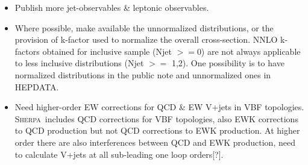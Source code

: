 \documentclass[a4paper,11pt,notoc]{article}
\newcommand{\SHERPA}{\textsc{Sherpa}}
\begin{document}
\begin{itemize}
\item Publish more jet-observables \& leptonic observables.
\item Where possible, make available the unnormalized distributions, or the provision of k-factor used to normalize the overall cross-section. NNLO k-factors obtained for inclusive sample (Njet $>=$0) are not always applicable to less inclusive distributions (Njet $>=$ 1,2). One possibility is to have normalized distributions in the public note and unnormalized ones in HEPDATA.
\item Need higher-order EW corrections for QCD \& EW V+jets in VBF topologies. \SHERPA\ includes QCD corrections for VBF topologies, also EWK corrections to QCD production but not QCD corrections to EWK production. At higher order there are also interferences between QCD and EWK production, need to calculate V+jets at all sub-leading one loop orders[?].  
\end{itemize}



\end{document}
